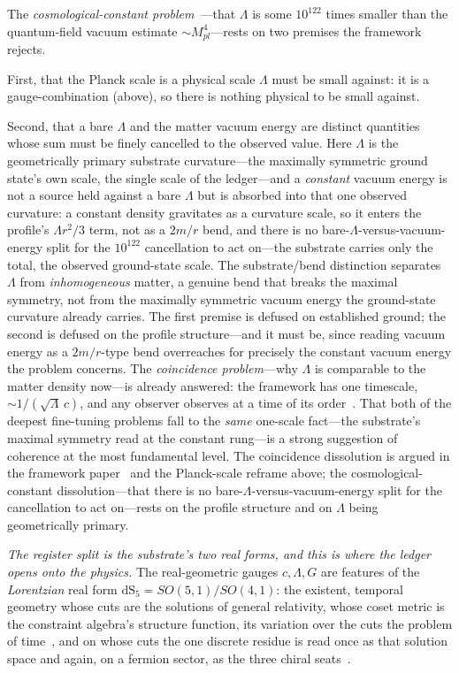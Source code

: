 \documentclass[11pt,a4paper]{article}
\theoremstyle{definition}
\begin{document}
The \emph{cosmological-constant problem}~\cite{Weinberg1989}---that $\Lambda$ is some $10^{122}$ times smaller than the quantum-field vacuum estimate $\sim M_{pl}^4$---rests on two premises the framework rejects. 

First, that the Planck scale is a physical scale $\Lambda$ must be small against: it is a gauge-combination (above), so there is nothing physical to be small against. 

Second, that a bare $\Lambda$ and the matter vacuum energy are distinct quantities whose sum must be finely cancelled to the observed value. Here $\Lambda$ is the geometrically primary substrate curvature---the maximally symmetric ground state's own scale, the single scale of the ledger---and a \emph{constant} vacuum energy is not a source held against a bare $\Lambda$ but is absorbed into that one observed curvature: a constant density gravitates as a curvature scale, so it enters the profile's $\Lambda r^2/3$ term, not as a $2m/r$ bend, and there is no bare-$\Lambda$-versus-vacuum-energy split for the $10^{122}$ cancellation to act on---the substrate carries only the total, the observed ground-state scale. The substrate/bend distinction separates $\Lambda$ from \emph{inhomogeneous} matter, a genuine bend that breaks the maximal symmetry, not from the maximally symmetric vacuum energy the ground-state curvature already carries. The first premise is defused on established ground; the second is defused on the profile structure---and it must be, since reading vacuum energy as a $2m/r$-type bend overreaches for precisely the constant vacuum energy the problem concerns. The \emph{coincidence problem}---why $\Lambda$ is comparable to the matter density now---is already answered: the framework has one timescale, $\sim1/(\sqrt\Lambda\,c)$, and any observer observes at a time of its order~\cite{JanzenCRframework}. That both of the deepest fine-tuning problems fall to the \emph{same} one-scale fact---the substrate's maximal symmetry read at the constant rung---is a strong suggestion of coherence at the most fundamental level. The coincidence dissolution is argued in the framework paper~\cite{JanzenCRframework} and the
Planck-scale reframe above; the cosmological-constant dissolution---that there is no
bare-$\Lambda$-versus-vacuum-energy split for the cancellation to act on---rests on the profile structure
and on $\Lambda$ being geometrically primary.

\emph{The register split is the substrate's two real forms, and this is where the ledger opens onto the physics.} The real-geometric gauges $c,\Lambda,G$ are features of the \emph{Lorentzian} real form $\mathrm{dS}_5=SO(5,1)/SO(4,1)$: the existent, temporal geometry whose cuts are the solutions of general relativity, whose coset metric is the constraint algebra's structure function, its variation over the cuts the problem of time~\cite{JanzenAlgebroid}, and on whose cuts the one discrete residue is read once as that solution space and again, on a fermion sector, as the three chiral seats~\cite{JanzenMatter}. 
\end{document}
